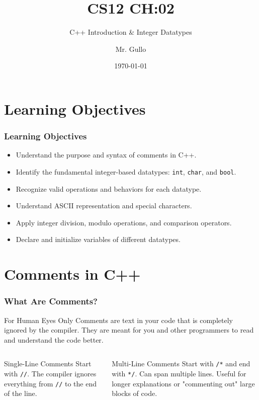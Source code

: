 \documentclass{beamer}
\title[Integer Datatypes]{CS12 CH:02}
\subtitle{C++ Introduction \& Integer Datatypes}
\author[Mr. Gullo]{Mr. Gullo}
\date[\today]{\today}
\begin{document}
\frame{\titlepage}

\section{Learning Objectives}

\begin{frame}
\frametitle{Learning Objectives}
\begin{itemize}
    \item Understand the purpose and syntax of comments in C++.\pause
    \item Identify the fundamental integer-based datatypes: \texttt{int}, \texttt{char}, and \texttt{bool}.\pause
    \item Recognize valid operations and behaviors for each datatype.\pause
    \item Understand ASCII representation and special characters.\pause
    \item Apply integer division, modulo operations, and comparison operators.\pause
    \item Declare and initialize variables of different datatypes.
\end{itemize}
\end{frame}

\section{Comments in C++}

\begin{frame}
\frametitle{What Are Comments?}
\begin{block}{For Human Eyes Only}
Comments are text in your code that is completely ignored by the compiler. They are meant for you and other programmers to read and understand the code better.
\end{block}
\pause

\begin{columns}[T]
    \begin{column}{0.5\textwidth}
        \begin{alertblock}{Single-Line Comments}
        Start with \texttt{//}. The compiler ignores everything from \texttt{//} to the end of the line.
        \end{alertblock}
    \end{column}\pause
    \begin{column}{0.5\textwidth}
        \begin{exampleblock}{Multi-Line Comments}
        Start with \texttt{/*} and end with \texttt{*/}. Can span multiple lines. Useful for longer explanations or "commenting out" large blocks of code.
        \end{exampleblock}
    \end{column}
\end{columns}
\end{frame}
\end{document}
